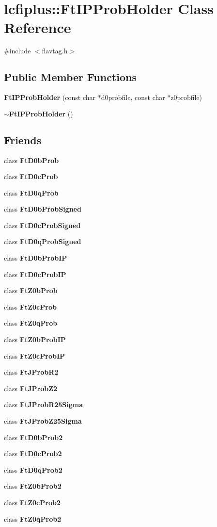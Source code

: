 \section{lcfiplus\-:\-:Ft\-I\-P\-Prob\-Holder Class Reference}
\label{classlcfiplus_1_1FtIPProbHolder}


{\ttfamily \#include $<$flavtag.\-h$>$}

\subsection*{Public Member Functions}
\begin{DoxyCompactItemize}
\item 
{\bf Ft\-I\-P\-Prob\-Holder} (const char $\ast$d0probfile, const char $\ast$z0probfile)
\item 
{\bf $\sim$\-Ft\-I\-P\-Prob\-Holder} ()
\end{DoxyCompactItemize}
\subsection*{Friends}
\begin{DoxyCompactItemize}
\item 
class {\bf Ft\-D0b\-Prob}
\item 
class {\bf Ft\-D0c\-Prob}
\item 
class {\bf Ft\-D0q\-Prob}
\item 
class {\bf Ft\-D0b\-Prob\-Signed}
\item 
class {\bf Ft\-D0c\-Prob\-Signed}
\item 
class {\bf Ft\-D0q\-Prob\-Signed}
\item 
class {\bf Ft\-D0b\-Prob\-I\-P}
\item 
class {\bf Ft\-D0c\-Prob\-I\-P}
\item 
class {\bf Ft\-Z0b\-Prob}
\item 
class {\bf Ft\-Z0c\-Prob}
\item 
class {\bf Ft\-Z0q\-Prob}
\item 
class {\bf Ft\-Z0b\-Prob\-I\-P}
\item 
class {\bf Ft\-Z0c\-Prob\-I\-P}
\item 
class {\bf Ft\-J\-Prob\-R2}
\item 
class {\bf Ft\-J\-Prob\-Z2}
\item 
class {\bf Ft\-J\-Prob\-R25\-Sigma}
\item 
class {\bf Ft\-J\-Prob\-Z25\-Sigma}
\item 
class {\bf Ft\-D0b\-Prob2}
\item 
class {\bf Ft\-D0c\-Prob2}
\item 
class {\bf Ft\-D0q\-Prob2}
\item 
class {\bf Ft\-Z0b\-Prob2}
\item 
class {\bf Ft\-Z0c\-Prob2}
\item 
class {\bf Ft\-Z0q\-Prob2}
\end{DoxyCompactItemize}


